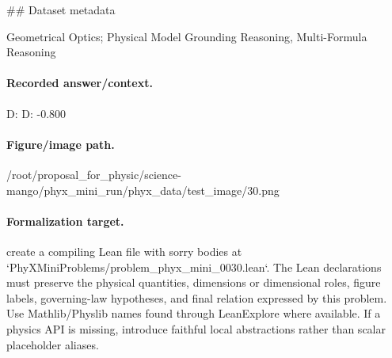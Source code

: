 \#\# Dataset metadata

Geometrical Optics; Physical Model Grounding Reasoning, Multi-Formula Reasoning

\paragraph{Recorded answer/context.}
D: D: -0.800

\paragraph{Figure/image path.}
/root/proposal\_for\_physic/science-mango/phyx\_mini\_run/phyx\_data/test\_image/30.png

\paragraph{Formalization target.}
create a compiling Lean file with sorry bodies at `PhyXMiniProblems/problem\_phyx\_mini\_0030.lean`. The Lean declarations must preserve the physical quantities, dimensions or dimensional roles, figure labels, governing-law hypotheses, and final relation expressed by this problem.
Use Mathlib/Physlib names found through LeanExplore where available. If a physics API is missing, introduce faithful local abstractions rather than scalar placeholder aliases.

